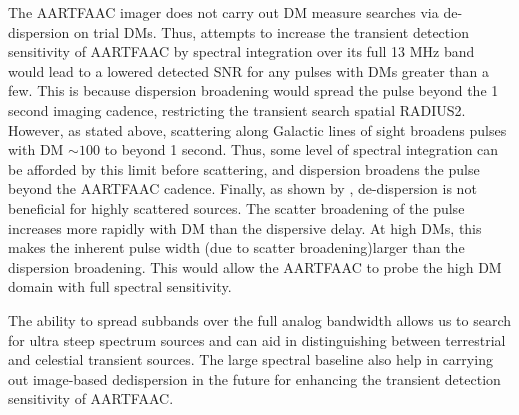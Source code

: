 \documentclass{aa}
\begin{document}

The AARTFAAC imager does not carry  out DM measure searches via de-dispersion on
trial DMs.   Thus, attempts to  increase the transient detection  sensitivity of
AARTFAAC  by spectral integration  over its  full 13  MHz band  would lead  to a
lowered  detected SNR  for any  pulses with  DMs greater  than a  few.   This is
because dispersion broadening would spread the pulse beyond the 1 second imaging
cadence, restricting  the transient search  spatial RADIUS2. However,  as stated
above, scattering along Galactic lines of  sight broadens pulses with DM $\sim$$100$ to
beyond 1  second. Thus, some  level of spectral  integration can be  afforded by
this  limit before  scattering, and  dispersion  broadens the  pulse beyond  the
AARTFAAC   cadence.    Finally,   as  shown   by   \citet{hassall2013detecting},
de-dispersion  is not  beneficial  for highly  scattered  sources.  The  scatter
broadening  of the  pulse increases  more rapidly  with DM  than  the dispersive
delay.   At high  DMs,  this makes  the  inherent pulse  width  (due to  scatter
broadening)larger than the dispersion  broadening. This would allow the AARTFAAC
to probe the high DM domain with full spectral sensitivity.

The  ability to  spread subbands  over the  full analog  bandwidth allows  us to
search for  ultra steep spectrum sources  and can aid  in distinguishing between
terrestrial and  celestial transient sources.  The large  spectral baseline also
help in  carrying out image-based dedispersion  in the future  for enhancing the
transient detection sensitivity of AARTFAAC.
\end{document}
